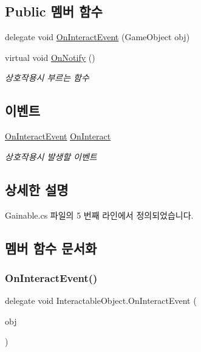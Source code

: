 \subsection*{Public 멤버 함수}
\begin{DoxyCompactItemize}
\item 
delegate void \mbox{\hyperlink{class_interactable_object_a70a579e4b09d53e6cb77b5222189d5eb}{On\+Interact\+Event}} (Game\+Object obj)
\item 
virtual void \mbox{\hyperlink{class_interactable_object_aa5c752d17471fe0daf58a4d00c218a29}{On\+Notify}} ()
\begin{DoxyCompactList}\small\item\em 상호작용시 부르는 함수 \end{DoxyCompactList}\end{DoxyCompactItemize}
\subsection*{이벤트}
\begin{DoxyCompactItemize}
\item 
\mbox{\hyperlink{class_interactable_object_a70a579e4b09d53e6cb77b5222189d5eb}{On\+Interact\+Event}} \mbox{\hyperlink{class_interactable_object_afe5e0b16d86c2ed4abf4a71a1995f7ae}{On\+Interact}}
\begin{DoxyCompactList}\small\item\em 상호작용시 발생할 이벤트 \end{DoxyCompactList}\end{DoxyCompactItemize}


\subsection{상세한 설명}


Gainable.\+cs 파일의 5 번째 라인에서 정의되었습니다.



\subsection{멤버 함수 문서화}
\mbox{\label{class_interactable_object_a70a579e4b09d53e6cb77b5222189d5eb}} 
\subsubsection{\texorpdfstring{OnInteractEvent()}{OnInteractEvent()}}
{\footnotesize\ttfamily delegate void Interactable\+Object.\+On\+Interact\+Event (\begin{DoxyParamCaption}\item[{Game\+Object}]{obj }\end{DoxyParamCaption})\hspace{0.3cm}{\ttfamily [inherited]}}


